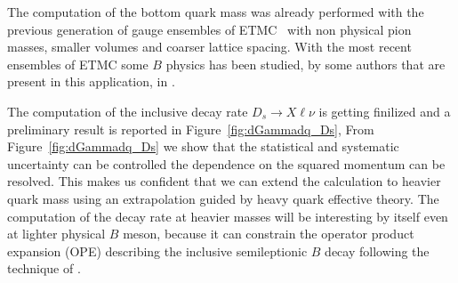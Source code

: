 
The computation of the bottom quark mass was already performed with
the previous generation of gauge ensembles of ETMC~\cite{ETM:2016nbo,ETM:2011zey} with
non physical pion masses, smaller volumes and coarser lattice spacing.
With the most recent ensembles of ETMC some $B$ physics has been studied, by some authors
that are present in this application, in \cite{Frezzotti:2024kqk}.


The computation of the inclusive decay rate $D_s\to X \ell \nu$
is getting finilized and a preliminary result is reported in Figure~\ref{fig:dGammadq_Ds},
From  Figure~\ref{fig:dGammadq_Ds} we show that the statistical and systematic
uncertainty can be controlled  the
dependence on the squared momentum can be resolved. This makes us
confident that we can extend the calculation to heavier quark mass
using an extrapolation guided by heavy quark effective theory.
The computation of the decay rate at heavier masses will be interesting by itself even at lighter 
physical $B$ meson, because it can constrain the 
operator product expansion (OPE)  describing the inclusive semileptionic $B$ decay 
\cite{Manohar:1993qn, Blok:1993va, Gambino:2004qm} following the technique of \cite{Gambino:2022dvu}.



\endinput

